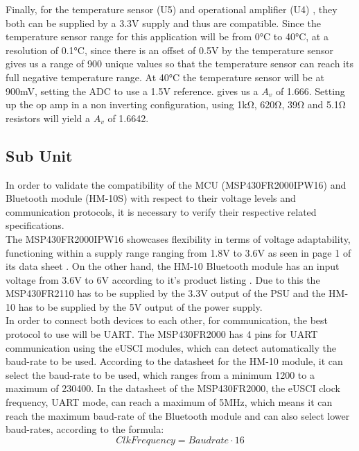 Finally, for the temperature sensor (U5) \cite{TMP36GT9Z} and operational amplifier (U4) \cite{MCP6022I}, they both can be supplied by a 3.3\si{\V} supply and thus are compatible. Since the temperature sensor range for this application will be from 0\si{\celsius} to 40\si{\celsius}, at a resolution of 0.1\si{\celsius}, since there is an offset of 0.5\si{\V} by the temperature sensor gives us a range of 900 unique values so that the temperature sensor can reach its full negative temperature range. At 40\si{\celsius} the temperature sensor will be at 900\si{\milli\volt}, setting the ADC to use a 1.5\si{\V} reference. gives us a $A_{v}$ of 1.666. Setting up the op amp in a non inverting configuration, using 1\si{\kilo\ohm}, 620\si{\ohm}, 39\si{\ohm} and 5.1\si{\ohm} resistors will yield a $A_{v}$ of 1.6642.
\subsection{Sub Unit}
In order to validate the compatibility of the MCU (MSP430FR2000IPW16) and Bluetooth module (HM-10S) with respect to their voltage levels and communication protocols, it is necessary to verify their respective related specifications.\\
The MSP430FR2000IPW16 showcases flexibility in terms of voltage adaptability, functioning within a supply range ranging from 1.8V to 3.6V as seen in page 1 of its data sheet \cite{MSP430FR2000IPW16}. On the other hand, the HM-10 Bluetooth module has an input voltage from 3.6\si{\V} to 6\si{\V} according to it's product listing \cite{AmazonComHiLetgo}. Due to this the MSP430FR2110 has to be supplied by the 3.3\si{V} output of the PSU and the HM-10 has to be supplied by the 5\si{\V} output of the power supply.\\
In order to connect both devices to each other, for communication, the best protocol to use will be UART. The MSP430FR2000 has 4 pins for UART communication using the eUSCI modules, which can detect automatically the baud-rate to be used. According to the datasheet for the HM-10 module\cite{AmazonComHiLetgo}, it can select the baud-rate to be used, which ranges from a minimum 1200 to a maximum of 230400. In the datasheet of the MSP430FR2000, the eUSCI clock frequency, UART mode, can reach a maximum of 5MHz, which means it can reach the maximum baud-rate of the Bluetooth module and can also select lower baud-rates, according to the formula:
\begin{equation}
	Clk Frequency = Baudrate \cdot 16
\end{equation}
